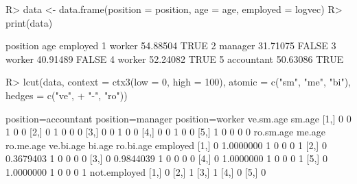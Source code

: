 \begin{Schunk}
% --begin: "lcut.data.frame"
\begin{Sinput}
R> data <- data.frame(position = position, age = age, employed = logvec)
R> print(data)
\end{Sinput}
\begin{Soutput}
    position      age employed
1     worker 54.88504     TRUE
2    manager 31.71075    FALSE
3     worker 40.91489    FALSE
4     worker 52.24082     TRUE
5 accountant 50.63086     TRUE
\end{Soutput}
\begin{Sinput}
R> lcut(data, context = ctx3(low = 0, high = 100), atomic = c("sm", "me", "bi"), hedges = c("ve", 
+     "-", "ro"))
\end{Sinput}
\begin{Soutput}
     position=accountant position=manager position=worker ve.sm.age sm.age
[1,]                   0                0               1         0      0
[2,]                   0                1               0         0      0
[3,]                   0                0               1         0      0
[4,]                   0                0               1         0      0
[5,]                   1                0               0         0      0
     ro.sm.age    me.age ro.me.age ve.bi.age bi.age ro.bi.age employed
[1,]         0 1.0000000         1         0      0         0        1
[2,]         0 0.3679403         1         0      0         0        0
[3,]         0 0.9844039         1         0      0         0        0
[4,]         0 1.0000000         1         0      0         0        1
[5,]         0 1.0000000         1         0      0         0        1
     not.employed
[1,]            0
[2,]            1
[3,]            1
[4,]            0
[5,]            0
\end{Soutput}
%
% --end: "lcut.data.frame"
\end{Schunk}
